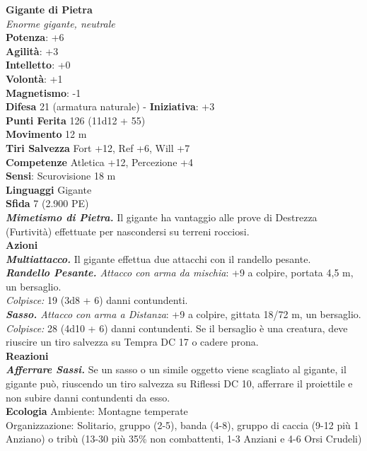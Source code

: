 \begin{multicols}{2}
\medskip\textbf{Gigante di Pietra}\\
\emph{Enorme gigante, neutrale}\\
\textbf{Potenza}: +6\\
\textbf{Agilità}: +3\\
\textbf{Intelletto}: +0\\
\textbf{Volontà}: +1\\
\textbf{Magnetismo}: -1\\
\textbf{Difesa} 21 (armatura naturale) - \textbf{Iniziativa}: +3\\
\textbf{Punti Ferita} 126 (11d12 + 55)\\
\textbf{Movimento} 12 m\\
\textbf{Tiri Salvezza} Fort +12, Ref +6, Will +7\\
\textbf{Competenze} Atletica +12, Percezione +4\\
\textbf{Sensi}: Scurovisione 18 m\\
\textbf{Linguaggi} Gigante\\
\textbf{Sfida} 7 (2.900 PE)\smallskip\\
\emph{\textbf{Mimetismo di Pietra.}} Il gigante ha vantaggio alle prove di Destrezza (Furtività) effettuate per nascondersi su terreni rocciosi.\\
\smallskip\textbf{Azioni}\\
\emph{\textbf{Multiattacco.}} Il gigante effettua due attacchi con il randello pesante.\\
\emph{\textbf{Randello Pesante.} Attacco con arma da mischia}: +9 a colpire, portata 4,5 m, un bersaglio.\\
\emph{Colpisce:} 19 (3d8 + 6) danni contundenti.\\
\emph{\textbf{Sasso.} Attacco con arma a Distanza}: +9 a colpire, gittata 18/72 m, un bersaglio.\\
\emph{Colpisce:} 28 (4d10 + 6) danni contundenti. Se il bersaglio è una creatura, deve riuscire un tiro salvezza su Tempra DC 17 o cadere prona.\\
\textbf{Reazioni}\\
\emph{\textbf{Afferrare Sassi.}} Se un sasso o un simile oggetto viene scagliato al gigante, il gigante può, riuscendo un tiro salvezza su Riflessi DC 10, afferrare il proiettile e non subire danni contundenti da esso.\\
\textbf{Ecologia}
Ambiente: Montagne temperate\\
Organizzazione: Solitario, gruppo (2-5), banda (4-8), gruppo di caccia (9-12 più 1 Anziano) o tribù (13-30 più 35\% non combattenti, 1-3 Anziani e 4-6 Orsi Crudeli)\\

\end{multicols}
